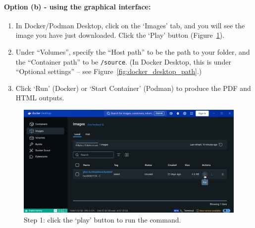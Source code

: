 \paragraph{Option (b) - using the graphical interface:}

\begin{enumerate}
    \item In Docker/Podman Desktop, click on the `Images' tab, and you will see the image you have just downloaded. Click the `Play' button (Figure~\ref{fig:docker_desktop_run}).
    \item Under ``Volumes'', specify the ``Host path'' to be the path to your folder, and the ``Container path'' to be \verb|/source|. (In Docker Desktop, this is under ``Optional settings'' -- see Figure~\ref{fig:docker_desktop_path}.)
    \item Click `Run' (Docker) or `Start Container' (Podman) to produce the PDF and HTML outputs.
\end{enumerate}

\begin{figure}[h!]
    \centering
    \includegraphics[width=\textwidth]{img/docker_desktop_run.png}
    \caption{Step 1: click the `play' button to run the command.}
    \label{fig:docker_desktop_run}
\end{figure}

